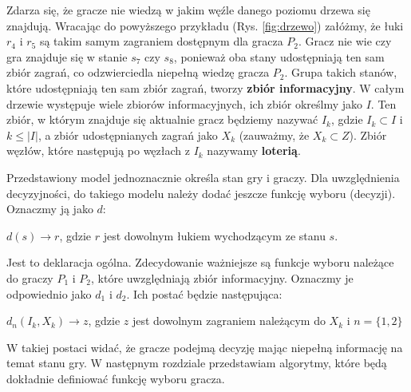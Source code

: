 Zdarza się, że gracze nie wiedzą w jakim węźle danego poziomu drzewa się znajdują. Wracając do powyższego przykładu (Rys. \ref{fig:drzewo}) załóżmy, że łuki $r_4$ i $r_5$ są takim samym zagraniem dostępnym dla gracza $P_2$. Gracz nie wie czy gra znajduje się w stanie $s_7$ czy $s_8$, ponieważ oba stany udostępniają ten sam zbiór zagrań, co odzwierciedla niepełną wiedzę gracza $P_2$. Grupa takich stanów, które udostępniają ten sam zbiór zagrań, tworzy \textbf{zbiór informacyjny}. W całym drzewie występuje wiele zbiorów informacyjnych, ich zbiór określmy jako $I$. Ten zbiór, w którym znajduje się aktualnie gracz będziemy nazywać $I_k$, gdzie $I_k \subset I$ i $k \leq |I|$, a zbiór udostępnianych zagrań jako $X_k$ (zauważmy, że $X_k \subset Z$). Zbiór węzłów, które następują po węzłach z $I_k$ nazywamy \textbf{loterią}.

Przedstawiony model jednoznacznie określa stan gry i graczy. Dla uwzględnienia decyzyjności, do takiego modelu należy dodać jeszcze funkcję wyboru (decyzji). Oznaczmy ją jako $d$:
\begin{center}
	$d(s) \rightarrow r$, gdzie $r$ jest dowolnym łukiem wychodzącym ze stanu $s$.
\end{center}

Jest to deklaracja ogólna. Zdecydowanie ważniejsze są funkcje wyboru należące do graczy $P_1$ i $P_2$, które uwzględniają zbiór informacyjny. Oznaczmy je odpowiednio jako $d_1$ i $d_2$. Ich postać będzie następująca:

\begin{center}
	$d_n(I_k, X_k) \rightarrow z$, gdzie $z$ jest dowolnym zagraniem należącym do $X_k$ i $n = \{1, 2\}$
\end{center}
W takiej postaci widać, że gracze podejmą decyzję mając niepełną informację na temat stanu gry. W następnym rozdziale przedstawiam algorytmy, które będą dokładnie definiować funkcję wyboru gracza.

